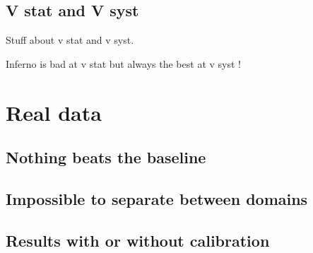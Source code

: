 



\subsection{V stat and V syst} %
\label{sub:v_stat_and_v_syst}

Stuff about v stat and v syst.

Inferno is bad at v stat but always the best at v syst !








\section{Real data} %
\label{sec:real_data}










\subsection{Nothing beats the baseline} %
\label{sub:nothing_beats_the_baseline}








\subsection{Impossible to separate between domains} %
\label{sub:impossible_to_separate_between_domains}










\subsection{Results with or without calibration} %
\label{sub:results_with_or_without_calibration}

